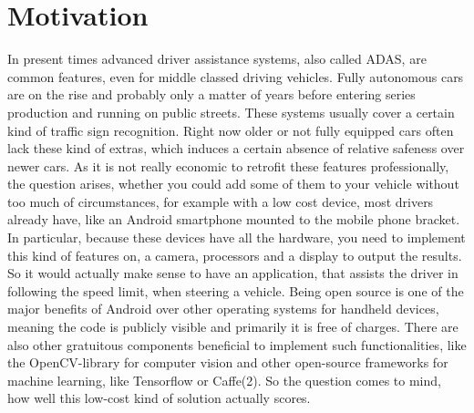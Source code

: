 
\chapter{Motivation}\label{chapter:motivation}
In present times advanced driver assistance systems, also called ADAS, are common features, even for middle classed driving vehicles. Fully autonomous cars are on the rise and probably only a matter of years before entering series production and running on public streets. These systems usually cover a certain kind of traffic sign recognition. Right now older or not fully equipped cars often lack these kind of extras, which induces a certain absence of relative safeness over newer cars. As it is not really economic to retrofit these features professionally, the question arises, whether you could add some of them to your vehicle without too much of circumstances, for example with a low cost device, most drivers already have, like an Android smartphone mounted to the mobile phone bracket. In particular, because these devices have all the hardware, you need to implement this kind of features on, a camera, processors and a display to output the results. So it would actually make sense to have an application, that assists the driver in following the speed limit, when steering a vehicle. \newline
Being open source is one of the major benefits of Android over other operating systems for handheld devices, meaning the code is publicly visible and primarily it is free of charges. There are also other gratuitous components beneficial to implement such functionalities, like the OpenCV-library for computer vision and other open-source frameworks for machine learning, like Tensorflow or Caffe(2). So the question comes to mind, how well this low-cost kind of solution actually scores. 

